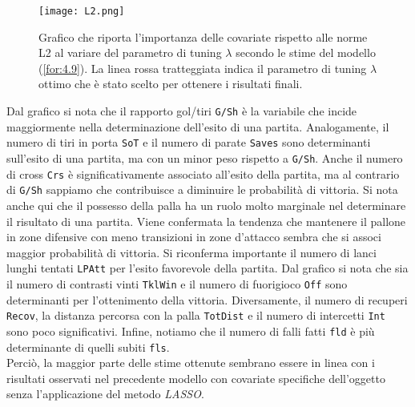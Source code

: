 \begin{figure}[htbp]
	\begin{center}
		\texttt{[image: L2.png]}
		\caption{Grafico che riporta l'importanza delle covariate rispetto alle norme L2 al variare del parametro di tuning $\lambda$ secondo le stime del modello (\ref{for:4.9}). La linea rossa tratteggiata indica il parametro di tuning $\lambda$ ottimo che è stato scelto per ottenere i risultati finali.} \label{fig:l2BTCL}
	\end{center}
\end{figure}
Dal grafico si nota che il rapporto gol/tiri \texttt{G/Sh} è la variabile che incide maggiormente nella determinazione dell'esito di una partita. Analogamente, il numero di tiri in porta \texttt{SoT} e il numero di parate \texttt{Saves} sono determinanti sull'esito di una partita, ma con un minor peso rispetto a \texttt{G/Sh}. Anche il numero di cross \texttt{Crs} è significativamente associato all'esito della partita, ma al contrario di \texttt{G/Sh} sappiamo che contribuisce a diminuire le probabilità di vittoria. Si nota anche qui che il possesso della palla ha un ruolo molto marginale nel determinare il risultato di una partita. Viene confermata la tendenza che mantenere il pallone in zone difensive con meno transizioni in zone d'attacco sembra che si associ maggior probabilità di vittoria. Si riconferma importante il numero di lanci lunghi tentati \texttt{LPAtt} per l'esito favorevole della partita. Dal grafico si nota che sia il numero di contrasti vinti \texttt{TklWin} e il numero di fuorigioco \texttt{Off} sono determinanti per l'ottenimento della vittoria. Diversamente, il numero di recuperi \texttt{Recov}, la distanza percorsa con la palla \texttt{TotDist} e il numero di intercetti \texttt{Int} sono poco significativi. Infine, notiamo che il numero di falli fatti \texttt{fld} è più determinante di quelli subiti \texttt{fls}.\\
Perciò, la maggior parte delle stime ottenute sembrano essere in linea con i risultati osservati nel precedente modello con covariate specifiche dell'oggetto senza l'applicazione del metodo \emph{LASSO}.

